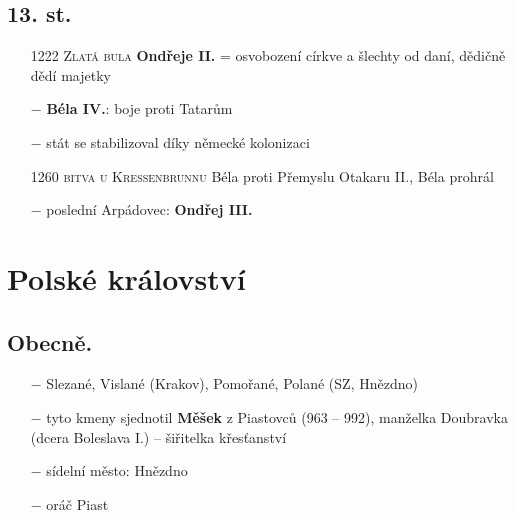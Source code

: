 \documentclass{article}
\begin{document}
\subsection*{13. st.}
\begin{itemize}
    \vspace{-0.5em}
    \setlength\itemsep{0.15em}
    \item[1222] \textsc{Zlatá bula} \textbf{Ondřeje II.} = osvobození církve a šlechty od daní, dědičně dědí majetky
    \item[$-$] \textbf{Béla IV.}: boje proti Tatarům
    \item[$-$] stát se stabilizoval díky německé kolonizaci
    \item[1260] \textsc{bitva u Kressenbrunnu} Béla proti Přemyslu Otakaru II., Béla prohrál
    \item[$-$] poslední Arpádovec: \textbf{Ondřej III.}
\end{itemize}

\section*{Polské království}
\subsection*{Obecně.}
\begin{itemize}
    \vspace{-0.5em}
    \setlength\itemsep{0.15em}
    \item[$-$] Slezané, Vislané (Krakov), Pomořané, Polané (SZ, Hnězdno)
    \item[$-$] tyto kmeny sjednotil \textbf{Měšek} z Piastovců (963 -- 992), manželka Doubravka (dcera Boleslava I.) -- šiřitelka křesťanství
    \item[$-$] sídelní město: Hnězdno
    \item[$-$] oráč Piast
\end{itemize}
\end{document}
